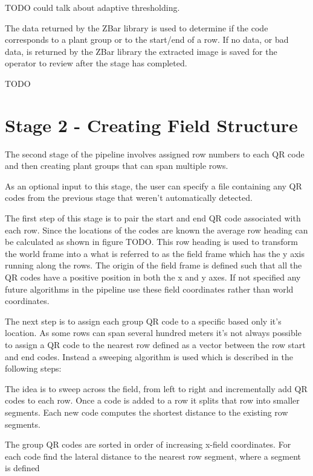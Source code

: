 TODO could talk about adaptive thresholding.  

The data returned by the ZBar library is used to determine if the code corresponds to a plant group or to the start/end of a row.  If no data, or bad data, is returned by the ZBar library the extracted image is saved for the operator to review after the stage has completed. 

TODO


\section{Stage 2 - Creating Field Structure}
\label{processing-stage2}

The second stage of the pipeline involves assigned row numbers to each QR code and then creating plant groups that can span multiple rows.  

As an optional input to this stage, the user can specify a file containing any QR codes from the previous stage that weren't automatically detected.  

The first step of this stage is to pair the start and end QR code associated with each row.  Since the locations of the codes are known the average row heading can be calculated as shown in figure TODO.  This row heading is used to transform the world frame into a what is referred to as the field frame which has the y axis running along the rows.  The origin of the field frame is defined such that all the QR codes have a positive position in both the x and y axes.  If not specified any future algorithms in the pipeline use these field coordinates rather than world coordinates.  

The next step is to assign each group QR code to a specific based only it's location.  As some rows can span several hundred meters it's not always possible to assign a QR code to the nearest row defined as a vector between the row start and end codes.  Instead a sweeping algorithm is used which is described in the following steps:

The idea is to sweep across the field, from left to right and incrementally add QR codes to each row. Once a code is added to a row it splits that row into smaller segments.  Each new code computes the shortest distance to the existing row segments.

The group QR codes are sorted in order of increasing x-field coordinates.  For each code find the lateral distance to the nearest row segment, where a segment is defined  


